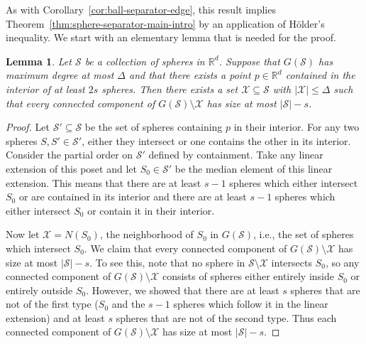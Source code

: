 \documentclass[11pt, reqno]{amsart}
\theoremstyle{plain}
\newtheorem{lemma}[theorem]{Lemma}
\theoremstyle{definition}
\theoremstyle{remark}
\numberwithin{theorem}{section}
\numberwithin{equation}{section}
\newcommand{\R}{\mathbb R}
\newcommand{\fS}{\mathcal S}
\newcommand{\fX}{\mathcal X}
\begin{document}
As with Corollary~\ref{cor:ball-separator-edge}, this result implies Theorem~\ref{thm:sphere-separator-main-intro} by an application of H\"older's inequality. We start with an elementary lemma that is needed for the proof.

\begin{lemma}
\label{lem:nested-sphere-separator}
Let $\fS$ be a collection of spheres in $\R^d$. Suppose that $G(\fS)$ has maximum degree at most $\Delta$ and that there exists a point $p\in\R^d$ contained in the interior of at least $2s$ spheres. Then there exists a set $\fX\subseteq\fS$ with $|\fX|\leq\Delta$ such that every connected component of $G(\fS)\setminus\fX$ has size at most $|\fS|-s$.
\end{lemma}

\begin{proof}
Let $\fS'\subseteq\fS$ be the set of spheres containing $p$ in their interior. For any two spheres $S,S'\in\fS'$, either they intersect or one contains the other in its interior. Consider the partial order on $\fS'$ defined by containment. Take any linear extension of this poset and let $S_0\in\fS'$ be the median element of this linear extension. This means that there are at least $s-1$ spheres which either intersect $S_0$ or are contained in its interior and there are at least $s-1$ spheres which either intersect $S_0$ or contain it in their interior.

Now let $\fX=N(S_0)$, the neighborhood of $S_0$ in $G(\fS)$, i.e., the set of spheres which intersect $S_0$. We claim that every connected component of $G(\fS)\setminus\fX$ has size at most $|\fS|-s$. To see this, note that no sphere in $\fS\setminus\fX$ intersects $S_0$, so any connected component of $G(\fS)\setminus\fX$ consists of spheres either entirely inside $S_0$ or entirely outside $S_0$. However, we showed that there are at least $s$ spheres that are not of the first type ($S_0$ and the $s-1$ spheres which follow it in the linear extension) and at least $s$ spheres that are not of the second type. Thus each connected component of $G(\fS)\setminus\fX$ has size at most $|\fS|-s$.
\end{proof}
\end{document}
